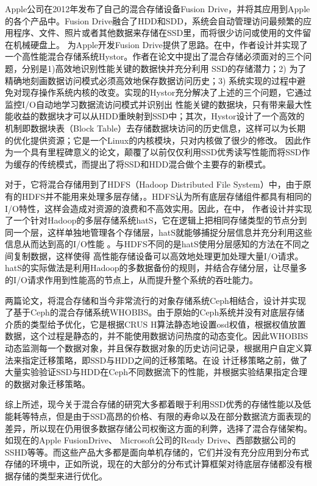 Apple公司在2012年发布了自己的混合存储设备Fusion Drive，并将其应用到Apple的各个产品中。Fusion Drive融合了HDD和SDD，系统会自动管理访问最频繁的应用程序、文件、照片或者其他数据来存储在SSD里，而将很少访问或使用的文件留在机械硬盘上。
为Apple开发Fusion Drive提供了思路。在中，作者设计并实现了一个高性能混合存储系统Hystor。作者在论文中提出了混合存储必须面对的三个问题，分别是1)高效地识别性能关键的数据快并充分利用
SSD的存储潜力；2) 为了精确地刻画数据访问模式必须高效地保存数据访问历史；3) 系统实现的过程中避免对现存操作系统内核的改变。实现的Hystor充分解决了上述的三个问题，它通过监控I/O自动地学习数据流访问模式并识别出
性能关键的数据块，只有带来最大性能收益的数据块才可以从HDD重映射到SSD中；其次，Hystor设计了一个高效的机制即数据块表（Block Table）去存储数据块访问的历史信息，这样可以为长期的优化提供资源；它是一个Linux的内核模块，只对内核做了很少的修改。
因此作为一个具有里程碑意义的论文，颠覆了以前仅仅利用SSD优秀读写性能而将SSD作为缓存的传统模式，而提出了将SSD和HDD混合做个主要存的新模式。

对于，它将混合存储用到了HDFS（Hadoop Distributed File System）中，由于原有的HDFS并不能用来处理多层存储，。HDFS认为所有底层存储组件都具有相同的I/O特性，这样会造成对资源的浪费和不高效实用。因此，在中，
作者设计并实现了一个针对Hadoop的多层存储系统hatS，它在逻辑上把相同存储类型的节点分到同一个层，这样单独地管理各个存储层，hatS就能够捕捉分层信息并充分利用这些信息从而达到高的I/O性能 。与HDFS不同的是hatS使用分层感知的方法在不同之间复制数据，这样使得
高性能存储设备可以高效地处理更加处理大量I/O请求。hatS的实际做法是利用Hadoop的多数据备份的规则，并结合存储分层，让尽量多的I/O请求作用到性能高的节点上，从而提升整个系统的吞吐能力。

两篇论文，将混合存储和当今非常流行的对象存储系统Ceph相结合，设计并实现了基于Ceph的混合存储系统WHOBBS。由于原始的Ceph系统并没有对底层存储介质的类型给予优化，它是根据CRUS
H算法\cite{weil2006crush}静态地设置osd权值，根据权值放置数据，这个过程是静态的，并不能使用数据访问热度的动态变化。因此WHOBBS动态监测每一个数据对象，并且保存数据对象的历史访问记录，根据用户自定义算法来指定迁移策略，即SSD与HDD之间的迁移策略。在设
计迁移策略之前，做了大量实验验证SSD与HDD在Ceph不同数据流下的性能，并根据实验结果指定合理的数据对象迁移策略。

综上所述，现今关于混合存储的研究大多都着眼于利用SSD优秀的存储性能以及低能耗等特点，但是由于SSD高昂的价格、有限的寿命以及在部分数据流方面表现的差异，所以现在仍用很多数据存储公司权衡这方面的利弊，选择了混合存储架构。如现在的Apple FusionDrive、
Microsoft公司的Ready Drive、西部数据公司的SSHD等等。而这些产品大多都是面向单机存储的，它们并没有充分应用到分布式存储的环境中，正如所说，现在的大部分的分布式计算框架对待底层存储都没有根据存储的类型来进行优化。

